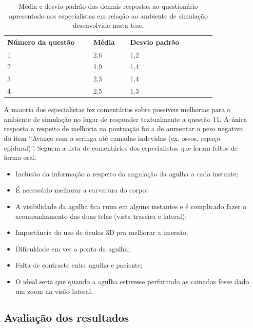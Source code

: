 \begin{table}[!ht]
\begin{center}
\caption{Média e desvio padrão das demais respostas ao questionário apresentado aos especialistas em relação ao ambiente de simulação desenvolvido nesta tese.}
\label{tab:demaisRespotasQuestionarioEspecialistas}
\begin{tabular}{|p{0.35\linewidth}|p{0.15\linewidth}|p{0.35\linewidth}|}
\hline
\textbf{Número da questão} & \textbf{Média} & \textbf{Desvio padrão}\\
\hline\hline
1 & 2,6 & 1,2\\
2 & 1,9 & 1,4\\
3 & 2,3 & 1,4\\
4 & 2,5 & 1,3\\
\hline
\end{tabular}
\end{center}
\end{table} 

A maioria dos especialistas fez comentários sobre possíveis melhorias para o ambiente de simulação no lugar de responder textualmente a questão 11. A única resposta a respeito de melhoria na pontuação foi a de aumentar o peso negativo do item ``Avanço com a seringa até camadas indevidas (ex. ossos, espaço epidural)''. Seguem a lista de comentários dos especialistas que foram feitos de forma oral: 
\begin{itemize}
   \item Inclusão da informação a respeito da angulação da agulha a cada instante;
   \item É necessário melhorar a curvatura do corpo;
   \item A visibilidade da agulha fica ruim em alguns instantes e é complicado fazer o acompanhamento das duas telas (vista traseira e lateral);
   \item Importância do uso de óculos 3D pra melhorar a imersão;
   \item Dificuldade em ver a ponta da agulha;
   \item Falta de contraste entre agulha e paciente;
   \item O ideal seria que quando a agulha estivesse perfurando as camadas fosse dado um zoom na visão lateral.
 \end{itemize}

\subsection{Avaliação dos resultados}
\label{sec:avaliacaoEspecialistas}

